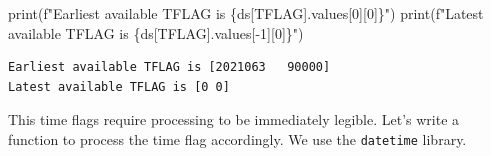 \documentclass[
  letterpaper,
  DIV=11,
  numbers=noendperiod]{scrreprt}
\newenvironment{Shaded}{\begin{snugshade}}{\end{snugshade}}
\newcommand{\BuiltInTok}[1]{\textcolor[rgb]{0.00,0.23,0.31}{#1}}
\newcommand{\DecValTok}[1]{\textcolor[rgb]{0.68,0.00,0.00}{#1}}
\newcommand{\NormalTok}[1]{\textcolor[rgb]{0.00,0.23,0.31}{#1}}
\newcommand{\OperatorTok}[1]{\textcolor[rgb]{0.37,0.37,0.37}{#1}}
\newcommand{\SpecialCharTok}[1]{\textcolor[rgb]{0.37,0.37,0.37}{#1}}
\newcommand{\SpecialStringTok}[1]{\textcolor[rgb]{0.13,0.47,0.30}{#1}}
\newcommand{\StringTok}[1]{\textcolor[rgb]{0.13,0.47,0.30}{#1}}
\begin{document}
\begin{Shaded}
\begin{Highlighting}[]
\BuiltInTok{print}\NormalTok{(}\SpecialStringTok{f"Earliest available TFLAG is }\SpecialCharTok{\{}\NormalTok{ds[}\StringTok{\textquotesingle{}TFLAG\textquotesingle{}}\NormalTok{]}\SpecialCharTok{.}\NormalTok{values[}\DecValTok{0}\NormalTok{][}\DecValTok{0}\NormalTok{]}\SpecialCharTok{\}}\SpecialStringTok{"}\NormalTok{)}
\BuiltInTok{print}\NormalTok{(}\SpecialStringTok{f"Latest available TFLAG is }\SpecialCharTok{\{}\NormalTok{ds[}\StringTok{\textquotesingle{}TFLAG\textquotesingle{}}\NormalTok{]}\SpecialCharTok{.}\NormalTok{values[}\OperatorTok{{-}}\DecValTok{1}\NormalTok{][}\DecValTok{0}\NormalTok{]}\SpecialCharTok{\}}\SpecialStringTok{"}\NormalTok{)}
\end{Highlighting}
\end{Shaded}

\begin{verbatim}
Earliest available TFLAG is [2021063   90000]
Latest available TFLAG is [0 0]
\end{verbatim}

This time flags require processing to be immediately legible. Let's
write a function to process the time flag accordingly. We use the
\texttt{datetime} library.
\end{document}
